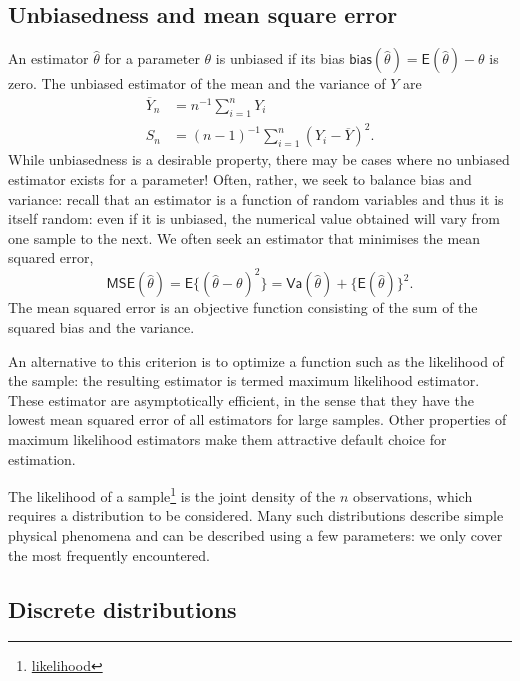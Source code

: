 \documentclass[
  11pt,
  letterpaper,
]{book}
\renewcommand{\href}[2]{#2\footnote{\url{#1}}}
\theoremstyle{definition}
\theoremstyle{definition}
\theoremstyle{definition}
\theoremstyle{definition}
\theoremstyle{remark}
\begin{document}
\hypertarget{unbiasedness-and-mean-square-error}{%
\subsection{Unbiasedness and mean square error}\label{unbiasedness-and-mean-square-error}}

An estimator \(\hat{\theta}\) for a parameter \(\theta\) is unbiased if its bias \(\mathsf{bias}(\hat{\theta})=\mathsf{E}(\hat{\theta})- \theta\) is zero.
The unbiased estimator of the mean and the variance of \(Y\) are
\begin{align*}
\overline{Y}_n &= n^{-1} \sum_{i=1}^n Y_i\\
S_n &= (n-1)^{-1} \sum_{i=1}^n (Y_i-\overline{Y})^2.
\end{align*}
While unbiasedness is a desirable property, there may be cases where no unbiased estimator exists for a parameter! Often, rather, we seek to balance bias and variance: recall that an estimator is a function of random variables and thus it is itself random: even if it is unbiased, the numerical value obtained will vary from one sample to the next. We often seek an estimator that minimises the mean squared error, \[\mathsf{MSE}(\hat{\theta}) = \mathsf{E}\{(\hat{\theta}-\theta)^2\}=\mathsf{Va}(\hat{\theta}) + \{\mathsf{E}(\hat{\theta})\}^2.\]
The mean squared error is an objective function consisting of the sum of the squared bias and the variance.

An alternative to this criterion is to optimize a function such as the likelihood of the sample: the resulting estimator is termed maximum likelihood estimator. These estimator are asymptotically efficient, in the sense that they have the lowest mean squared error of all estimators for large samples. Other properties of maximum likelihood estimators make them attractive default choice for estimation.

The \href{likelihood}{likelihood of a sample} is the joint density of the \(n\) observations, which requires a distribution to be considered. Many such distributions describe simple physical phenomena and can be described using a few parameters: we only cover the most frequently encountered.

\hypertarget{discrete-distributions}{%
\subsection{Discrete distributions}\label{discrete-distributions}}
\end{document}
